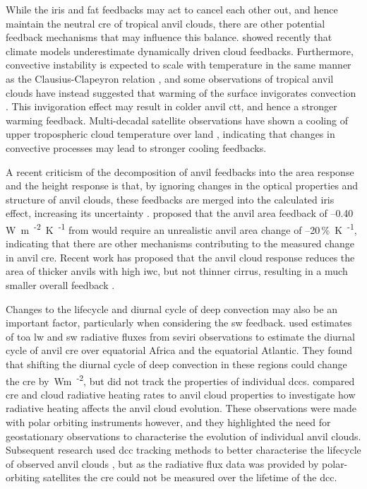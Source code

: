 While the iris and \acrshort{fat} feedbacks may act to cancel each other out, and hence maintain the neutral \acrshort{cre} of tropical anvil clouds, there are other potential feedback mechanisms that may influence this balance.
\citet{hill_climate_2023} showed recently that climate models underestimate dynamically driven cloud feedbacks.
Furthermore, convective instability is expected to scale with temperature in the same manner as the Clausius-Clapeyron relation \citep{seeley_why_2015, agard_clausius_2017}, and some observations of tropical anvil clouds have instead suggested that warming of the surface invigorates convection \citep{igel_cloudsat_2014}.
This invigoration effect may result in colder anvil \acrfull{ctt}, and hence a stronger warming feedback.
Multi-decadal satellite observations have shown a cooling of upper tropospheric cloud temperature over land \citep{liu_observed_2023}, indicating that changes in convective processes may lead to stronger cooling feedbacks.

A recent criticism of the \citet{sherwood_assessment_2020} decomposition of anvil feedbacks into the area response and the height response is that, by ignoring changes in the optical properties and structure of anvil clouds, these feedbacks are merged into the calculated iris effect, increasing its uncertainty \citep{raghuraman_observational_2024}.
\citet{mckim_weak_2024} proposed that the anvil area feedback of --0.40\,\unit{W m\textsuperscript{-2} K\textsuperscript{-1}} from \citet{sherwood_assessment_2020} would require an unrealistic anvil area change of --20\,\unit{\% K\textsuperscript{-1}}, indicating that there are other mechanisms contributing to the measured change in anvil \acrshort{cre}.
Recent work has proposed that the anvil cloud response reduces the area of thicker anvils with high \acrshort{iwc}, but not thinner cirrus, resulting in a much smaller overall feedback \citep{mckim_weak_2024, sokol_greater_2024}.

Changes to the lifecycle and diurnal cycle of deep convection may also be an important factor, particularly when considering the \acrshort{sw} feedback. 
\citet{nowicki_observations_2004} used estimates of \acrfull{toa} \acrshort{lw} and \acrshort{sw} radiative fluxes from \acrfull{seviri} observations to estimate the diurnal cycle of anvil \acrshort{cre} over equatorial Africa and the equatorial Atlantic. 
They found that shifting the diurnal cycle of deep convection in these regions could change the \acrshort{cre} by \,\unit{Wm\textsuperscript{-2}}, but did not track the properties of individual \acrshort{dcc}s.
\citet{bouniol_macrophysical_2016} compared \acrshort{cre} and cloud radiative heating rates to anvil cloud properties to investigate how radiative heating affects the anvil cloud evolution.
These observations were made with polar orbiting instruments however, and they highlighted the need for geostationary observations to characterise the evolution of individual anvil clouds.
Subsequent research used \acrshort{dcc} tracking methods to better characterise the lifecycle of observed anvil clouds \citep{bouniol_life_2021}, but as the radiative flux data was provided by polar-orbiting satellites the \acrshort{cre} could not be measured over the lifetime of the \acrshort{dcc}.


